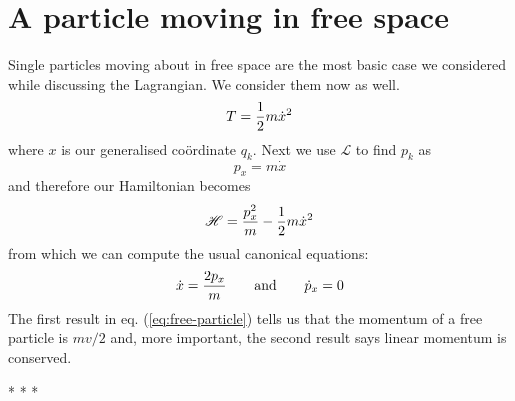 \documentclass[english,seminar,headertitle]{lecture}
\newcommand{\lag}{\mathscr{L}}
\newcommand{\ham}{\mathscr{H}}
\begin{document}
\section{A particle moving in free space}

Single particles moving about in free space are the most basic case we considered while discussing the Lagrangian. We consider them now as well.
%
$$
T = {1\over 2}m\dot{x}^2
$$
where $x$ is our generalised co\"{o}rdinate $q_k$. Next we use $\lag$ to find $p_k$ as
$$
p_x = m\dot{x}
$$
and therefore our Hamiltonian becomes
$$
\ham = {p_x^2 \over m} - {1\over 2}m\dot{x}^2
$$
from which we can compute the usual canonical equations:
\begin{equation}
\dot{x} = {2p_x \over m} \qquad \textrm{and} \qquad \dot{p}_x = 0 \label{eq:free-particle}
\end{equation}%
The first result in eq. (\ref{eq:free-particle}) tells us that the momentum of a free particle is $mv/2$ and, more important, the second result says linear momentum is conserved.

\vspace*{1.5cm}
{\centering
* \; * \; *

}
\end{document}
